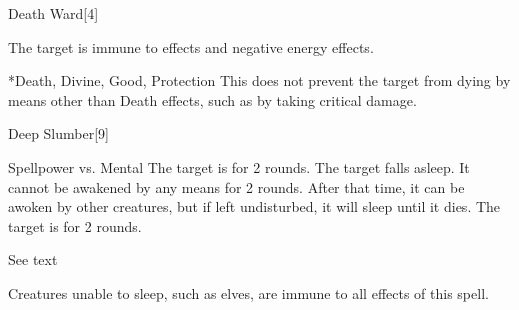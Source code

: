 \begin{spellsection}{Death Ward}[4]
    \begin{spellheader}
    \end{spellheader}
    \begin{spellcontent}
        \begin{spelltargetinginfo}
        \end{spelltargetinginfo}
        \begin{spelleffects}
            \spelleffect The target is immune to  effects and negative energy effects.
            \spelldur \durshort
        \end{spelleffects}
    \end{spellcontent}
    \begin{spellfooter}
        *{Death, Divine, Good, Protection}
        \spellnotes This does not prevent the target from dying by means other than Death effects, such as by taking critical damage.
        \miscastexplode
    \end{spellfooter}
\end{spellsection}

\begin{spellsection}{Deep Slumber}[9]
    \begin{spellheader}
    \end{spellheader}
    \begin{spellcontent}
        \begin{spelltargetinginfo}
        \end{spelltargetinginfo}
        \begin{spelleffects}
            \begin{spellattack}{Spellpower vs. Mental}
                \spellsuccess The target is \blinded for 2 rounds.
                \spellcritical The target falls asleep. It cannot be awakened by any means for 2 rounds. After that time, it can be awoken by other creatures, but if left undisturbed, it will sleep until it dies.
                \spellfailure The target is \dazed for 2 rounds.
            \end{spellattack}
            \spelldur See text
        \end{spelleffects}
    \end{spellcontent}
    \begin{spellfooter}
        \spellnotes Creatures unable to sleep, such as elves, are immune to all effects of this spell.
        \miscastrandom
    \end{spellfooter}
\end{spellsection}

